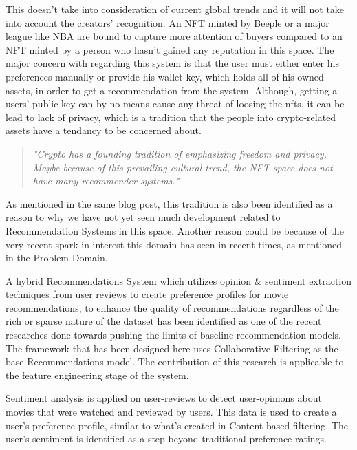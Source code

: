 This doesn't take into consideration of current global trends and it will not take into account the creators' recognition. An NFT minted by Beeple or a major league like NBA are bound to capture more attention of buyers compared to an NFT minted by a person who hasn't gained any reputation in this space. The major concern with regarding this system is that the user must either enter his preferences manually or provide his wallet key, which holds all of his owned assets, in order to get a recommendation from the system. Although, getting a users' public key can by no means cause any threat of loosing the \gls{nft}s, it can be lead to lack of privacy, which is a tradition that the people into crypto-related assets have a tendancy to be concerned about.


\begin{quote} 
\centering 
\emph{"Crypto has a founding tradition of emphasizing freedom and privacy. Maybe because of this prevailing cultural trend, the NFT space does not have many recommender systems."} 
\\
\raggedleft
\autocite{noauthor_what_2020}
\end{quote}

As mentioned in the same blog post, this tradition is also been identified as a reason to why we have not yet seen much development related to Recommendation Systems in this space. Another reason could be because of the very recent spark in interest this domain has seen in recent times, as mentioned in the Problem Domain.


\bigbreak

A hybrid Recommendations System \autocite{cheng_hybrid_2020} which utilizes opinion \& sentiment extraction techniques from user reviews to create preference profiles for movie recommendations, to enhance the quality of recommendations regardless of the rich or sparse nature of the dataset has been identified as one of the recent researches done towards pushing the limits of baseline recommendation models. The framework that has been designed here uses Collaborative Filtering as the base Recommendations model. The contribution of this research is applicable to the feature engineering stage of the system.

Sentiment analysis is applied on user-reviews to detect user-opinions about movies that were watched and reviewed by users. This data is used to create a user's preference profile, similar to what's created in Content-based filtering. The user's sentiment is identified as a step beyond traditional preference ratings.

